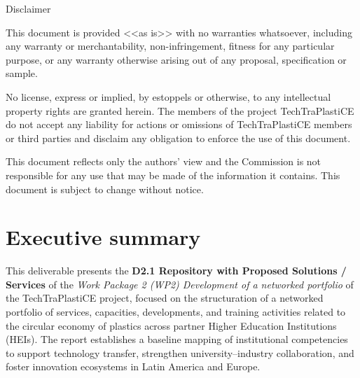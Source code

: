\documentclass[
  12pt,
  oneside]{book}
\renewcommand*\contentsname{Table of contents}
\newcommand\contentsname{Table of contents}
\begin{document}
\begin{frontmatter}
\begin{titlepage}
  \vfill


  

    
    
    \vfill
    
    {\scriptsize\centering\color{lightgray} 
    
    Disclaimer
    
    This document is provided <<as is>> with no warranties whatsoever, 
    including any warranty or merchantability, non-infringement, fitness for any particular 
    purpose, or any warranty otherwise arising out of any proposal, specification or sample.  
    
    No license, express or implied, by estoppels or otherwise, to any intellectual 
    property rights are granted herein. 
    The members of the project TechTraPlastiCE do not accept any liability for actions or 
    omissions of TechTraPlastiCE members or third parties and disclaim any obligation 
    to enforce the use of this document. 
    
    This document reflects only the authors' view and the Commission is not responsible 
    for any use that may be made of the information it contains.  
    This document is subject to change without notice. 
    
    }
    \normalsize
    
    
    
      \end{titlepage}
  \end{frontmatter}

\renewcommand*\contentsname{Contents}
{
\setcounter{tocdepth}{2}
\tableofcontents
}
\listoffigures
\listoftables

\mainmatter
\chapter*{Executive summary}\label{executive-summary}

This deliverable presents the \textbf{D2.1 Repository with Proposed
Solutions / Services} of the \emph{Work Package 2 (WP2) Development of a
networked portfolio} of the TechTraPlastiCE project, focused on the
structuration of a networked portfolio of services, capacities,
developments, and training activities related to the circular economy of
plastics across partner Higher Education Institutions (HEIs). The report
establishes a baseline mapping of institutional competencies to support
technology transfer, strengthen university--industry collaboration, and
foster innovation ecosystems in Latin America and Europe.
\end{document}
